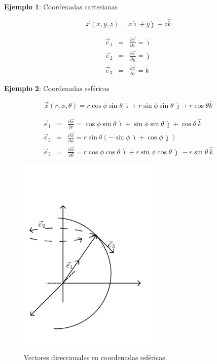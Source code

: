 \documentclass[12pt]{report}
\begin{document}
\textbf{Ejemplo 1}: Coordenadas cartesianas

\begin{equation} \nonumber
\vec{x}(x,y,z)= x \hat{\imath} + y \hat{\jmath} + z \hat{k}
\end{equation}

\begin{eqnarray} \label{2.29}
\vec{e}_1&=&\frac{\partial \vec{x}}{\partial x} = \hat{\imath} \\
\vec{e}_2&=&\frac{\partial \vec{x}}{\partial y} = \hat{\jmath} \\ \label{2.30}
\vec{e}_3&=&\frac{\partial \vec{x}}{\partial z} = \hat{k} \label{2.31}
\end{eqnarray}

\textbf{Ejemplo 2}: Coordenadas esféricas


\begin{equation} \nonumber
 \vec{x}(r,\phi,\theta)=r \cos \phi \sin \theta \ \hat{\imath} +  r \sin \phi \sin \theta \ \hat{\jmath} + r \cos \theta \hat{k} 
\end{equation}

\begin{eqnarray}  \label{2.32}
\vec{e}_1&=&\frac{\partial \vec{x}}{\partial r} = \cos{\phi}\sin{\theta}  \ \hat{\imath} + \sin{\phi}\sin{\theta} \ \hat{\jmath} + \cos{\theta} \ \hat{k} \\
\vec{e}_2&=&\frac{\partial \vec{x}}{\partial \phi} = r\sin{\theta}\left(-\sin{\phi} \ \hat{\imath} + \cos{\phi} \ \hat{\jmath} \right)  \\ \label{2.33}
\vec{e}_3&=&\frac{\partial \vec{x}}{\partial \theta} = r\cos{\phi}\cos{\theta} \ \hat{\imath} + r\sin{\phi}\cos{\theta}  \ \hat{\jmath} \ -r \sin{\theta} \ \hat{k}  \label{2.34}
\end{eqnarray}


\begin{figure}[H]
	\centering
	\includegraphics[width=7cm]{figura7.jpeg}
	\caption{ Vectores direccionales en coordenadas esféricas.}
	\label{fig.1}
\end{figure}
\end{document}
